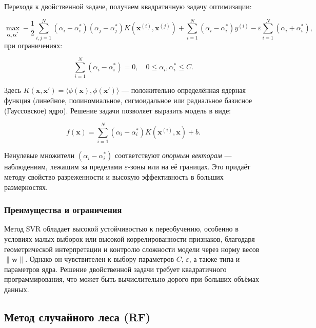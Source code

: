 Переходя к двойственной задаче, получаем квадратичную задачу оптимизации:

\begin{equation}
\max_{\boldsymbol{\alpha}, \boldsymbol{\alpha}^*} -\frac{1}{2} \sum_{i,j=1}^{N} (\alpha_i - \alpha_i^*)(\alpha_j - \alpha_j^*) K(\mathbf{x}^{(i)}, \mathbf{x}^{(j)}) + \sum_{i=1}^{N} (\alpha_i - \alpha_i^*) y^{(i)} - \varepsilon \sum_{i=1}^{N} (\alpha_i + \alpha_i^*),
\end{equation}
при ограничениях:

\begin{equation}
\sum_{i=1}^{N} (\alpha_i - \alpha_i^*) = 0, \quad 0 \leq \alpha_i, \alpha_i^* \leq C.
\end{equation}

Здесь $K(\mathbf{x}, \mathbf{x}') = \langle \phi(\mathbf{x}), \phi(\mathbf{x}') \rangle$ — положительно определённая ядерная функция (линейное, полиномиальное, сигмоидальное или радиальное базисное (Гауссовское) ядро). Решение задачи позволяет выразить модель в виде:

\begin{equation}
f(\mathbf{x}) = \sum_{i=1}^{N} (\alpha_i - \alpha_i^*) K(\mathbf{x}^{(i)}, \mathbf{x}) + b.
\end{equation}

Ненулевые множители $(\alpha_i - \alpha_i^*)$ соответствуют \textit{опорным векторам} --- наблюдениям, лежащим за пределами $\varepsilon$-зоны или на её границах. Это придаёт методу свойство разреженности и высокую эффективность в больших размерностях.

\subsubsection{Преимущества и ограничения}

Метод SVR обладает высокой устойчивостью к переобучению, особенно в условиях малых выборок или высокой коррелированности признаков, благодаря геометрической интерпретации и контролю сложности модели через норму весов $\|\mathbf{w}\|$. Однако он чувствителен к выбору параметров $C$, $\varepsilon$, а также типа и параметров ядра. Решение двойственной задачи требует квадратичного программирования, что может быть вычислительно дорого при больших объёмах данных.

\subsection{Метод случайного леса (RF)}

